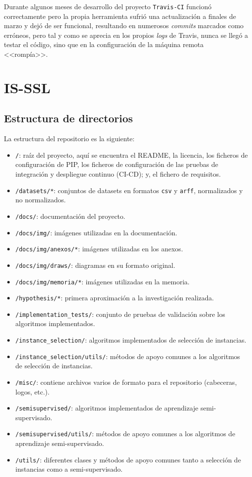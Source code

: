 Durante algunos meses de desarrollo del proyecto \texttt{Travis-CI} funcionó correctamente pero la propia herramienta sufrió una actualización a finales de marzo y dejó de ser funcional, resultando en numerosos \textit{commits} marcados como erróneos, pero tal y como se aprecia en los propios \textit{logs} de Travis, nunca se llegó a testar el código, sino que en la configuración de la máquina remota <<rompía>>.

\clearpage
\section{IS-SSL}

\subsection{Estructura de directorios}
La estructura del repositorio es la siguiente:
\begin{itemize}
\item \texttt{/}: raíz del proyecto, aquí se encuentra el README, la licencia, los ficheros de configuración de PIP, los ficheros de configuración de las pruebas de integración y despliegue continuo (CI-CD); y, el fichero de requisitos.
\item \texttt{/datasets/*}: conjuntos de datasets en formatos \texttt{csv} y \texttt{arff}, normalizados y no normalizados.
\item \texttt{/docs/}: documentación del proyecto.
\item \texttt{/docs/img/}: imágenes utilizadas en la documentación.
\item \texttt{/docs/img/anexos/*}: imágenes utilizadas en los anexos.
\item \texttt{/docs/img/draws/}: diagramas en su formato original.
\item \texttt{/docs/img/memoria/*}: imágenes utilizadas en la memoria.
\item \texttt{/hypothesis/*}: primera aproximación a la investigación realizada.
\item \texttt{/implementation\_tests/}: conjunto de pruebas de validación sobre los algoritmos implementados.
\item \texttt{/instance\_selection/}: algoritmos implementados de selección de instancias.
\item \texttt{/instance\_selection/utils/}: métodos de apoyo comunes a los algoritmos de selección de instancias.
\item \texttt{/misc/}: contiene archivos varios de formato para el repositorio (cabeceras, logos, etc.).
\item \texttt{/semisupervised/}: algoritmos implementados de aprendizaje semi-supervisado.
\item \texttt{/semisupervised/utils/}: métodos de apoyo comunes a los algoritmos de aprendizaje semi-supervisado.
\item \texttt{/utils/}: diferentes clases y métodos de apoyo comunes tanto a selección de instancias como a semi-supervisado.
\end{itemize}


